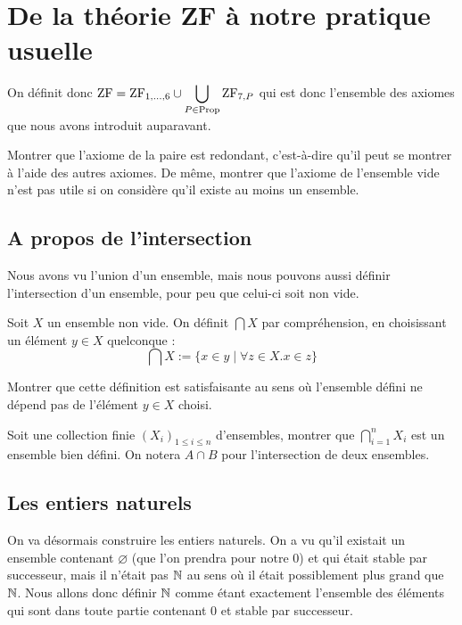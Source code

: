 \section{De la théorie ZF à notre pratique usuelle}

On définit donc $\mathrm{ZF} = \mathrm{ZF}_{1,\ldots,6}\cup\displaystyle{\bigcup_{P\in \mathrm{Prop}}\mathrm{ZF}_{7,P}}$ qui est donc l'ensemble des axiomes que nous avons introduit auparavant.

\begin{exo}
    Montrer que l'axiome de la paire est redondant, c'est-à-dire qu'il peut se montrer à l'aide des autres axiomes. De même, montrer que l'axiome de l'ensemble vide n'est pas utile si on considère qu'il existe au moins un ensemble.
\end{exo}

\subsection{A propos de l'intersection}

Nous avons vu l'union d'un ensemble, mais nous pouvons aussi définir l'intersection d'un ensemble, pour peu que celui-ci soit non vide.

\begin{defi}[Intersection]
    Soit $X$ un ensemble non vide. On définit $\bigcap X$ par compréhension, en choisissant un élément $y\in X$ quelconque : $$\bigcap X := \{ x\in y\mid \forall z\in X.x\in z\}$$
\end{defi}

\begin{exo}
    Montrer que cette définition est satisfaisante au sens où l'ensemble défini ne dépend pas de l'élément $y\in X$ choisi.
\end{exo}

\begin{exo}
    Soit une collection finie $(X_i)_{1\leq i \leq n}$ d'ensembles, montrer que $\displaystyle{\bigcap_{i=1}^n X_i}$ est un ensemble bien défini. On notera $A\cap B$ pour l'intersection de deux ensembles.
\end{exo}

\subsection{Les entiers naturels}

On va désormais construire les entiers naturels. On a vu qu'il existait un ensemble contenant $\varnothing$ (que l'on prendra pour notre $0$) et qui était stable par successeur, mais il n'était pas $\mathbb{N}$ au sens où il était possiblement plus grand que $\mathbb{N}$. Nous allons donc définir $\mathbb{N}$ comme étant exactement l'ensemble des éléments qui sont dans toute partie contenant $0$ et stable par successeur.

